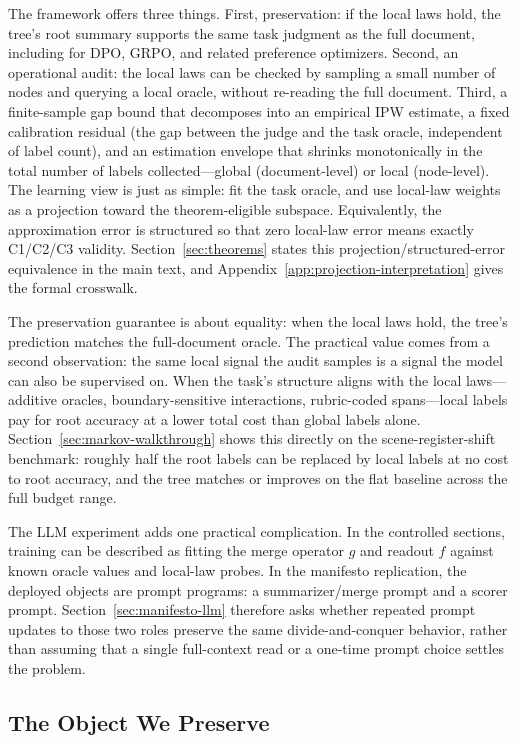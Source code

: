 The framework offers three things. First, preservation: if the local laws hold, the tree's root summary supports the same task judgment as the full document, including for DPO, GRPO, and related preference optimizers. Second, an operational audit: the local laws can be checked by sampling a small number of nodes and querying a local oracle, without re-reading the full document. Third, a finite-sample gap bound that decomposes into an empirical IPW estimate, a fixed calibration residual (the gap between the judge and the task oracle, independent of label count), and an estimation envelope that shrinks monotonically in the total number of labels collected---global (document-level) or local (node-level). The learning view is just as simple: fit the task oracle, and use local-law weights as a projection toward the theorem-eligible subspace. Equivalently, the approximation error is structured so that zero local-law error means exactly C1/C2/C3 validity. Section~\ref{sec:theorems} states this projection/structured-error equivalence in the main text, and Appendix~\ref{app:projection-interpretation} gives the formal crosswalk.

The preservation guarantee is about equality: when the local laws hold, the tree's prediction matches the full-document oracle. The practical value comes from a second observation: the same local signal the audit samples is a signal the model can also be supervised on. When the task's structure aligns with the local laws---additive oracles, boundary-sensitive interactions, rubric-coded spans---local labels pay for root accuracy at a lower total cost than global labels alone. Section~\ref{sec:markov-walkthrough} shows this directly on the scene-register-shift benchmark: roughly half the root labels can be replaced by local labels at no cost to root accuracy, and the tree matches or improves on the flat baseline across the full budget range.

The LLM experiment adds one practical complication. In the controlled
sections, training can be described as fitting the merge operator $g$ and
readout $f$ against known oracle values and local-law probes. In the
manifesto replication, the deployed objects are prompt programs: a
summarizer/merge prompt and a scorer prompt. Section~\ref{sec:manifesto-llm}
therefore asks whether repeated prompt updates to those two roles preserve
the same divide-and-conquer behavior, rather than assuming that a
single full-context read or a one-time prompt choice settles the problem.

\subsection{The Object We Preserve}

